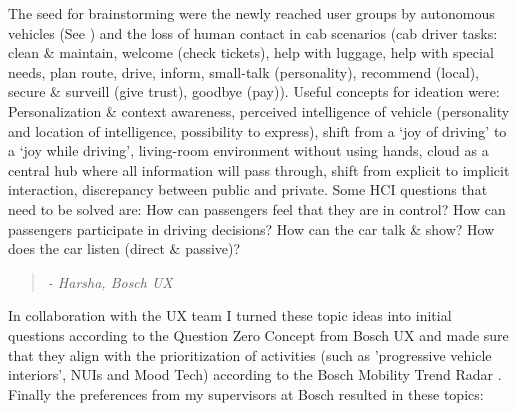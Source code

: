 The seed for brainstorming were the newly reached user groups by autonomous vehicles (See  ) and the loss of human contact in cab scenarios (cab driver tasks: clean \& maintain, welcome (check tickets), help with luggage, help with special needs, plan route, drive, inform, small-talk (personality), recommend (local), secure \& surveill (give trust), goodbye (pay)). Useful concepts for ideation were: Personalization \& context awareness, perceived intelligence of vehicle (personality and location of intelligence, possibility to express), shift from a ‘joy of driving’ to a ‘joy while driving’, living-room environment without using hands, cloud as a central hub where all information will pass through, shift from explicit to implicit interaction, discrepancy between public and private. Some HCI questions that need to be solved are: How can passengers feel that they are in control? How can passengers participate in driving decisions? How can the car talk \& show? How does the car listen (direct \& passive)?

\begin{quotation}\emph{ - Harsha, Bosch UX}\end{quotation}

In collaboration with the UX team I turned these topic ideas into initial questions according to the Question Zero Concept from Bosch UX \cite{RobertBoschUX2017QuestionZero} and made sure that they align with the prioritization of activities (such as 'progressive vehicle interiors', NUIs and Mood Tech) according to the Bosch Mobility Trend Radar \cite{RobertBoschNA2017RegionalRegional}. 
Finally the preferences from my supervisors at Bosch resulted in these topics:


